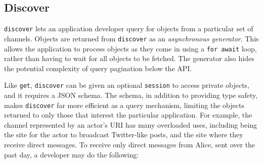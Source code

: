 




\subsection{Discover}

\texttt{discover} lets an application developer query for objects
from a particular set of channels.
Objects are returned from \texttt{discover} as an \emph{asynchronous generator}.
This allows the application to process objects as they come in
using a \texttt{for await} loop, rather than having to wait for all objects
to be fetched. The generator also hides the potential complexity of
query pagination below the API.

Like \texttt{get}, \texttt{discover} can be given an optional \texttt{session}
to access private objects, and it requires a JSON schema.
The schema,
in addition to providing type safety, makes \texttt{discover} far more efficient
as a query mechanism, limiting the objects returned to only those that interest the particular application.
For example, the channel represented by an actor's URI has many overloaded uses,
including being the site for the actor to broadcast Twitter-like posts,
and the site where they receive direct messages.
To receive only direct messages from Alice,
sent over the past day, a developer may do the following:

